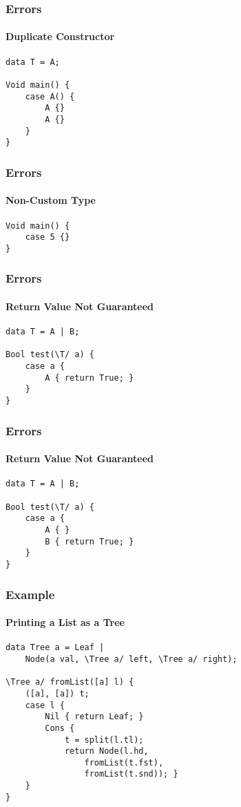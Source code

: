 \documentclass[12pt]{beamer}
\begin{document}
\begin{frame}[fragile]
    \frametitle{Errors}
    \framesubtitle{Duplicate Constructor}
    \begin{verbatim}
data T = A;

Void main() {
    case A() {
        A {}
        A {}
    }
}\end{verbatim}
\end{frame}

\begin{frame}[fragile]
    \frametitle{Errors}
    \framesubtitle{Non-Custom Type}
    \begin{verbatim}
Void main() {
    case 5 {}
}\end{verbatim}
\end{frame}

\begin{frame}[fragile]
    \frametitle{Errors}
    \framesubtitle{Return Value Not Guaranteed}
    \begin{verbatim}
data T = A | B;

Bool test(\T/ a) {
    case a {
        A { return True; }
    }
}\end{verbatim}
\end{frame}

\begin{frame}[fragile]
    \frametitle{Errors}
    \framesubtitle{Return Value Not Guaranteed}
    \begin{verbatim}
data T = A | B;

Bool test(\T/ a) {
    case a {
        A { }
        B { return True; }
    }
}\end{verbatim}
\end{frame}

\begin{frame}[fragile]
    \frametitle{Example}
    \framesubtitle{Printing a List as a Tree}
    \begin{verbatim}
data Tree a = Leaf |
    Node(a val, \Tree a/ left, \Tree a/ right);

\Tree a/ fromList([a] l) {
    ([a], [a]) t;
    case l {
        Nil { return Leaf; }
        Cons {
            t = split(l.tl);
            return Node(l.hd,
                fromList(t.fst),
                fromList(t.snd)); }
    }
}
\end{verbatim}
\end{frame}

\end{document}
